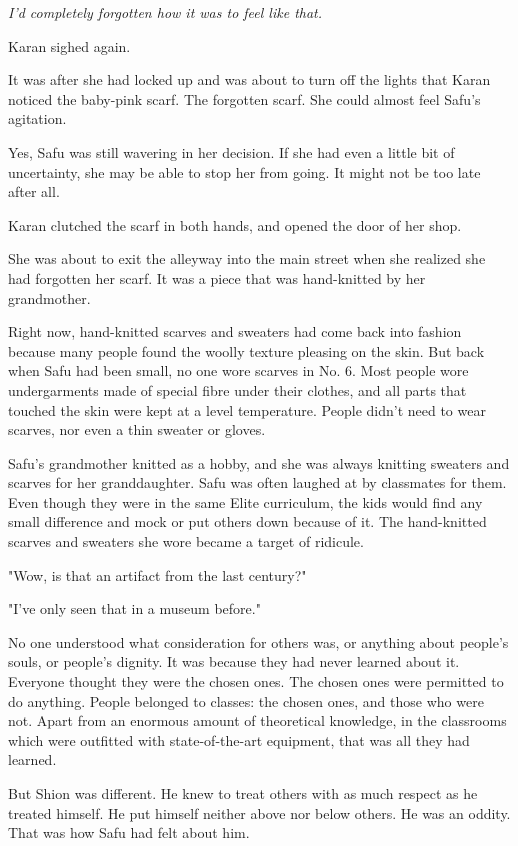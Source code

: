 \emph{I'd completely forgotten how it was to feel like that.}

Karan sighed again.

It was after she had locked up and was about to turn off the lights that
Karan noticed the baby-pink scarf. The forgotten scarf. She could almost
feel Safu's agitation.

Yes, Safu was still wavering in her decision. If she had even a little
bit of uncertainty, she may be able to stop her from going. It might not
be too late after all.

Karan clutched the scarf in both hands, and opened the door of her shop.

\myspace

She was about to exit the alleyway into the main street when she
realized she had forgotten her scarf. It was a piece that was
hand-knitted by her grandmother.

Right now, hand-knitted scarves and sweaters had come back into fashion
because many people found the woolly texture pleasing on the skin. But
back when Safu had been small, no one wore scarves in No. 6. Most people
wore undergarments made of special fibre under their clothes, and all
parts that touched the skin were kept at a level temperature. People
didn't need to wear scarves, nor even a thin sweater or gloves.

Safu's grandmother knitted as a hobby, and she was always knitting
sweaters and scarves for her granddaughter. Safu was often laughed at by
classmates for them. Even though they were in the same Elite curriculum,
the kids would find any small difference and mock or put others down
because of it. The hand-knitted scarves and sweaters she wore became a
target of ridicule.

"Wow, is that an artifact from the last century?"

"I've only seen that in a museum before."

No one understood what consideration for others was, or anything about
people's souls, or people's dignity. It was because they had never
learned about it. Everyone thought they were the chosen ones. The chosen
ones were permitted to do anything. People belonged to classes: the
chosen ones, and those who were not. Apart from an enormous amount of
theoretical knowledge, in the classrooms which were outfitted with
state-of-the-art equipment, that was all they had learned.

But Shion was different. He knew to treat others with as much respect as
he treated himself. He put himself neither above nor below others. He
was an oddity. That was how Safu had felt about him.


